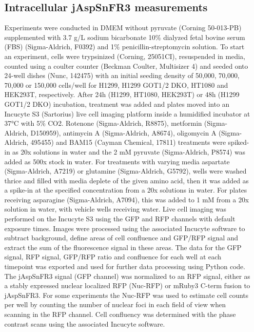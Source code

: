 \documentclass[9pt,lineno]{elife}
\begin{document}
\subsection{Intracellular jAspSnFR3 measurements}
Experiments were conducted in DMEM without pyruvate (Corning 50-013-PB) supplemented with 3.7 g/L sodium bicarbonate 10\% dialyzed fetal bovine serum (FBS) (Sigma-Aldrich, F0392) and 1\% penicillin-streptomycin solution.
To start an experiment, cells were trypsinized (Corning, 25051CI), resuspended in media, counted using a coulter counter (Beckman Coulter, Multisizer 4) and seeded onto 24-well dishes (Nunc, 142475) with an initial seeding density of 50,000, 70,000, 70,000 or 150,000 cells/well for H1299, H1299 GOT1/2 DKO, HT1080 and HEK293T, respectively.
After 24h (H1299, HT1080, HEK293T) or 48h (H1299 GOT1/2 DKO) incubation, treatment was added and plates moved into an Incucyte S3 (Sartorius) live cell imaging platform inside a humidified incubator at 37°C with 5\% CO2.
Rotenone (Sigma-Aldrich, R8875), metformin (Sigma-Aldrich, D150959), antimycin A (Sigma-Aldrich, A8674), oligomycin A (Sigma-Aldrich, 495455) and BAM15 (Cayman Chemical, 17811) treatments were spiked-in as 20x solutions in water and the 2 mM pyruvate (Sigma-Aldrich, P8574) was added as 500x stock in water.
For treatments with varying media aspartate (Sigma-Aldrich, A7219) or glutamine (Sigma-Aldrich, G5792), wells were washed thrice and filled with media deplete of the given amino acid, then it was added as a spike-in at the specified concentration from a 20x solutions in water.
For plates receiving asparagine (Sigma-Aldrich, A7094), this was added to 1 mM from a 20x solution in water, with vehicle wells receiving water.
Live cell imaging was performed on the Incucyte S3 using the GFP and RFP channels with default exposure times.
Images were processed using the associated Incucyte software to subtract background, define areas of cell confluence and GFP/RFP signal and extract the sum of the fluorescence signal in these areas.
The data for the GFP signal, RFP signal, GFP/RFP ratio and confluence for each well at each timepoint was exported and used for further data processing using Python code.
The jAspSnFR3 signal (GFP channel) was normalized to an RFP signal, either as a stably expressed nuclear localized RFP (Nuc-RFP) or mRuby3 C-term fusion to jAspSnFR3.
For some experiments the Nuc-RFP was used to estimate cell counts per well by counting the number of nuclear foci in each field of view when scanning in the RFP channel.
Cell confluency was determined with the phase contrast scans using the associated Incucyte software.
\end{document}
